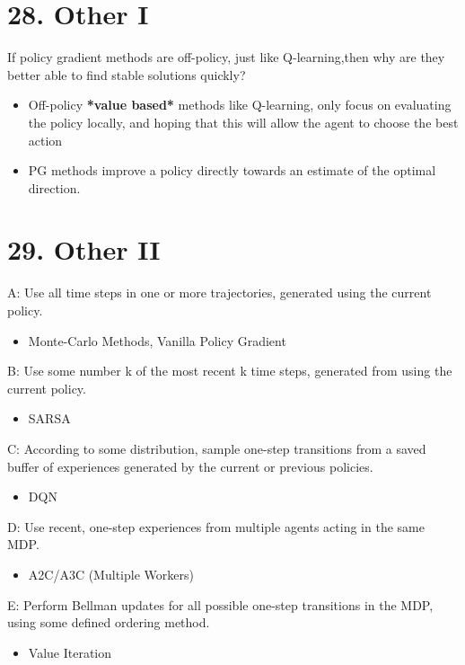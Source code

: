 \documentclass[letterpaper,10pt]{article}
\begin{document}
\begin{multicols}{2}
\section*{28. Other I}
If policy gradient methods are off-policy, just like Q-learning,then why are they better able to find stable solutions quickly?

\begin{itemize}
    \item Off-policy \textbf{*value based*} methods like Q-learning, only focus on evaluating the policy locally, and hoping that this will allow the agent to choose the best action
    \item PG methods improve a policy directly towards an estimate of the optimal direction.
\end{itemize}

\section*{29. Other II}
\noindent A: Use all time steps in one or more trajectories, generated using the current policy.
\begin{itemize}
    \item Monte-Carlo Methods, Vanilla Policy Gradient
\end{itemize}

\noindent B: Use some number k of the most recent k time steps, generated from using the current policy.
\begin{itemize}
    \item SARSA
\end{itemize}

\noindent C: According to some distribution, sample one-step transitions from a saved buffer of experiences generated by the current or previous policies.
\begin{itemize}
    \item DQN
\end{itemize}

\noindent D: Use recent, one-step experiences from multiple agents acting in the same MDP.
\begin{itemize}
    \item A2C/A3C (Multiple Workers)
\end{itemize}

\noindent E: Perform Bellman updates for all possible one-step transitions in the MDP, using some defined ordering method.
\begin{itemize}
    \item Value Iteration
\end{itemize}


\end{multicols}
\end{document}
